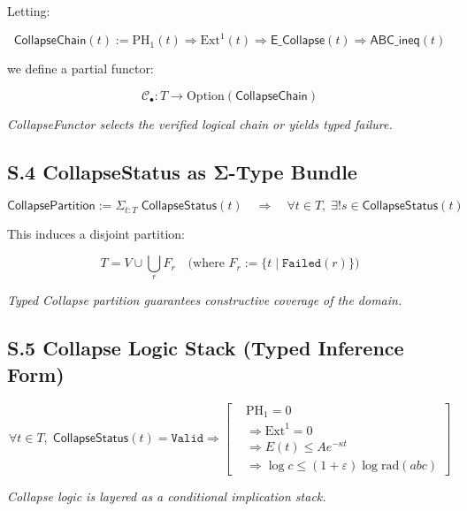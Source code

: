 \documentclass[11pt]{article}
\begin{document}
Letting:

\[
\mathsf{CollapseChain}(t) := \mathrm{PH}_1(t) \Rightarrow \mathrm{Ext}^1(t) \Rightarrow \mathsf{E\_Collapse}(t) \Rightarrow \mathsf{ABC\_ineq}(t)
\]

we define a partial functor:

\[
\mathcal{C}_\bullet : T \longrightarrow \mathrm{Option}(\mathsf{CollapseChain})
\]

\begin{center}
\textit{CollapseFunctor selects the verified logical chain or yields typed failure.}
\end{center}

\subsection*{S.4 CollapseStatus as Σ-Type Bundle}

\[
\mathsf{CollapsePartition} := \Sigma_{t:T} \; \mathsf{CollapseStatus}(t)
\quad\Rightarrow\quad
\forall t \in T,\; \exists! s \in \mathsf{CollapseStatus}(t)
\]

This induces a disjoint partition:

\[
T = V \cup \bigcup_r F_r
\quad \text{(where } F_r := \{ t \mid \texttt{Failed}(r) \} \text{)}
\]

\begin{center}
\textit{Typed Collapse partition guarantees constructive coverage of the domain.}
\end{center}

\subsection*{S.5 Collapse Logic Stack (Typed Inference Form)}

\[
\boxed{
\forall t \in T,\;
\mathsf{CollapseStatus}(t) = \texttt{Valid}
\Rightarrow
\left[
\begin{aligned}
& \mathrm{PH}_1 = 0 \\
& \Rightarrow \mathrm{Ext}^1 = 0 \\
& \Rightarrow E(t) \leq Ae^{-\kappa t} \\
& \Rightarrow \log c \leq (1+\varepsilon)\log \mathrm{rad}(abc)
\end{aligned}
\right]
}
\]

\begin{center}
\textit{Collapse logic is layered as a conditional implication stack.}
\end{center}
\end{document}
